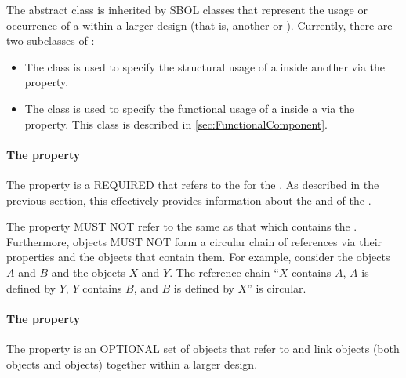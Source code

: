 The  abstract class is inherited by SBOL classes that represent the usage or occurrence of a  within a larger design (that is, another  or ). Currently, there are two subclasses of :
\begin{itemize}
\item The  class is used to specify the structural usage of a  inside another  via the  property.
\item The  class is used to specify the functional usage of a  inside a  via the  property. This class is described in \ref{sec:FunctionalComponent}.
\end{itemize}

\paragraph{The  property}
\label{sec:definition}

The  property is a REQUIRED  that refers to the  for the . As described in the previous section, this  effectively provides information about the  and  of the .

The  property MUST NOT refer to the same  as that which contains the . Furthermore,  objects MUST NOT form a circular chain of references via their  properties and the  objects that contain them. For example, consider the  objects $A$ and $B$ and the  objects $X$ and $Y$. The reference chain ``$X$ contains $A$, $A$ is defined by $Y$, $Y$ contains $B$, and $B$ is defined by $X$'' is circular. 

\paragraph{The  property}
\label{sec:mapsTos}

The  property is an OPTIONAL set of  objects that refer to and link  objects (both  objects and  objects) together within a larger design.

